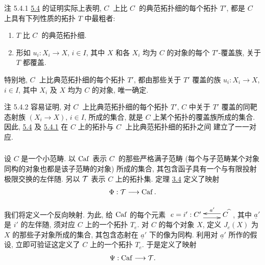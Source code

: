 \begin{enonce*}[remark]{注 5.4.1}
\hyperref[II.prop5.4]{5.4} 的证明实际上表明,
$C^{\widehat{\phantom{,}}}$ 上比 $C^{\widehat{\phantom{,}}}$
的典范拓扑细的每个拓扑 $T'$,
都是 $C^{\widehat{\phantom{,}}}$ 上具有下列性质的拓扑 $T$ 中最粗者:
\begin{enumerate}
\renewcommand{\theenumi}{\alph{enumi}}
\renewcommand{\labelenumi}{\theenumi)}
\item $T$ 比 $C^{\widehat{\phantom{,}}}$ 的典范拓扑细.

\item 形如 $u_i:X_i\rightarrow X$, $i\in I$,
其中 $X$ 和各 $X_i$ 均为 $C$ 的对象的每个 $T'$-覆盖族,
关于 $T$ 都覆盖.
\end{enumerate}
\end{enonce*}

特别地, $C^{\widehat{\phantom{,}}}$ 上比典范拓扑细的每个拓扑 $T'$,
都由那些关于 $T'$ 覆盖的族 $u_i:X_i\rightarrow X$, $i\in I$,
其中 $X_i$ 及 $X$ 均为 $C$ 的对象, 唯一确定.

\begin{enonce*}[remark]{注 5.4.2}
容易\pageoriginale{}证明,
对 $C^{\widehat{\phantom{,}}}$ 上比典范拓扑细的每个拓扑 $T'$,
$C$ 中关于 $T'$ 覆盖的同靶态射族 $(X_i\rightarrow X)$,
$i\in I$, 所成的集合,
就是 $C$ 上某个拓扑的覆盖族所成的集合.
因此, \hyperref[II.prop5.4]{5.4} 及 \hyperref[II.rem5.4.1]{5.4.1}
在 $C$ 上的拓扑与 $C^{\widehat{\phantom{,}}}$ 上比典范拓扑细的拓扑之间
建立了一一对应.
\end{enonce*}

\setcounter{subsection}{5} \setcounter{subsubsection}{-1}
\subsubsection{}
设 $C$ 是一个小范畴.
以 $\operatorname{Caf}$ 表示 $C^{\widehat{\phantom{,}}}$ 的那些严格满子范畴
(每个与子范畴某个对象同构的对象也都是该子范畴的对象) 所成的集合,
其包含函子具有一个与有限投射极限交换的左伴随.
另以 ${\mathcal T}$ 表示 $C$ 上的拓扑集.
定理 \hyperref[II.theo3.4]{3.4} 定义了映射
$$
\Phi:{\mathcal T}\longrightarrow \operatorname{Caf}{}.
$$

我们将定义一个反向映射.
为此, 给 $\operatorname{Caf}$ 的每个元素
$\xymatrix{ e=i': C' \ar@<-4pt>[r]&
\ar@<-2pt>[l]_(.35){a'} C^{\widehat{\phantom{,}}} }$,
其中 $\underline{a}'$ 是 $i'$ 的左伴随,
须对应 $C$ 上的一个拓扑 $T_e$.
对 $C$ 的每个对象 $X$,
定义 $J_e(X)$ 为 $X$ 的那些子对象所成的集合,
其包含态射在 $\underline{a}'$ 下的像为同构.
利用对 $\underline{a}'$ 所作的假设,
立即可验证这定义了 $C$ 上的一个拓扑 $T_e$.
于是定义了映射
$$
\Psi:\operatorname{Caf}\longrightarrow {\mathcal T}{}.
$$

